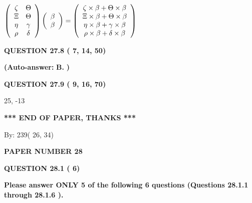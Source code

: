 \documentclass[12pt]{article}
\begin{document}
$  %
 \left( \begin{array}
 {
 c
 c
 }
                    \zeta & 
 \Theta \\ 
                    \Xi & 
 \Theta \\ 
 \eta & 
 \gamma \\ 
 \rho & 
 \delta
 \end{array} \right)
 \left( \begin{array}
 {
 c
 }
 \beta \\ 
 \beta
 \end{array} \right)
=
  \left( \begin{array}
 {
 c
 }
                    \zeta \times  \beta   +  \Theta \times  \beta \\ 
                    \Xi \times  \beta   +  \Theta \times  \beta \\ 
 \eta \times  \beta   +  \gamma \times  \beta \\ 
 \rho \times  \beta   +  \delta \times  \beta
 \end{array} \right)
$
 
  
  
{\textbf{\large{QUESTION
27.8 
 (          7,         14,         50)
}}}
 
 
{\textbf{(Auto-answer:}}
{\textbf{\large{
B.}}}
{\textbf{)}}
 
 
  
  
{\textbf{\large{QUESTION
27.9 
 (          9,         16,         70)
}}}

25,  %
-13
 
   
   
   
   
\vspace{1.0in} 
{\textbf{\large{ *** END OF PAPER, THANKS *** }}} 
   
   
\hspace{1.0in} By: 
         239(         26,          34)
   
   
   
   
\newpage 
\setcounter{page}{ 
    28001 } 
   
   
 {\textbf{ \Large{ PAPER NUMBER          28 }}}
   
   
   
   
  
\vspace{0.2in}
  
{\textbf{\Large{QUESTION
28.1 
 (          6)
}}}
  
  
{\textbf{\Large{Please answer ONLY  %
           5 %
 of the following  %
           6 %
 questions (Questions  %
28.1.1 %
 through  %
28.1.6 %
 ). }}}
   
\end{document}
